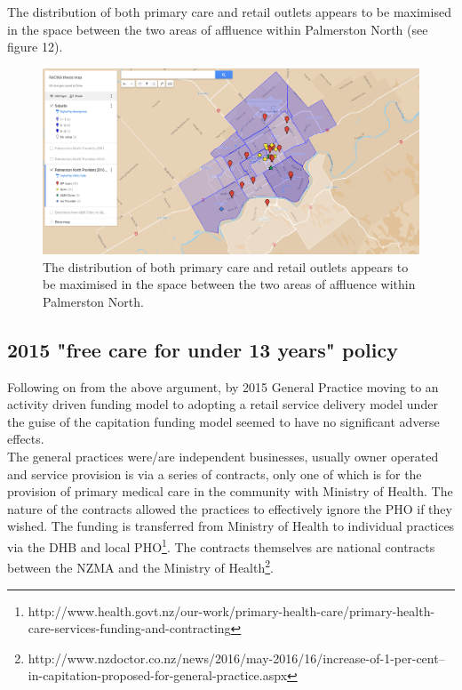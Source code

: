 \documentclass[11pt,a4paper]{article}
\begin{document}
The distribution of both primary care and retail outlets appears to be maximised in the space between the two areas of affluence within Palmerston North (see figure 12).\\

\begin{figure}[htp]
\centering
\includegraphics[scale=0.40]{fig12.png}
\caption{The distribution of both primary care and retail outlets appears to be maximised in the space between the two areas of affluence within Palmerston North.}
\label{Distribution of General Practitioners overlaid on suburb's social deprivation}
\end{figure}

\pagebreak
\subsection{2015 "free care for under 13 years" policy}
Following on from the above argument, by 2015 General Practice moving to an activity driven funding model to adopting a retail service delivery model under the guise of the capitation funding model seemed to have no significant adverse effects.\\

The general practices were/are independent businesses, usually owner operated and service provision is via a series of contracts, only one of which is for the provision of primary medical care in the community with Ministry of Health. The nature of the contracts allowed the practices to effectively ignore the PHO if they wished. The funding is transferred from Ministry of Health to individual practices via the DHB and local PHO\footnote{http://www.health.govt.nz/our-work/primary-health-care/primary-health-care-services-funding-and-contracting}. The contracts themselves are national contracts between the NZMA and the Ministry of Health\footnote{http://www.nzdoctor.co.nz/news/2016/may-2016/16/increase-of-1-per-cent--in-capitation-proposed-for-general-practice.aspx}.\\
\end{document}
